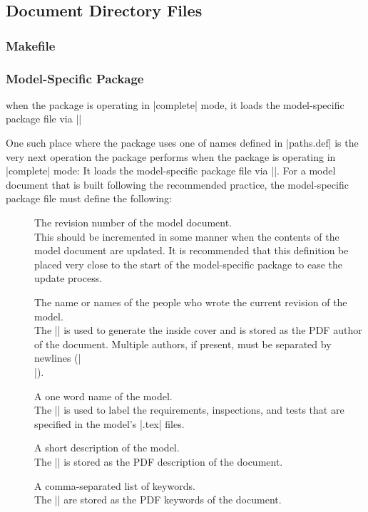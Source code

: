 \subsection{Document Directory Files}
\subsubsection{Makefile}
\subsubsection{Model-Specific Package}\label{sec:model.sty}
when the \dynenv package is operating in |complete| mode,
it loads the model-specific
package file via |\RequirePackage{\MODELNAME}|

One such place where the \dynenv package uses one of names defined in
|paths.def| is the very next operation the \dynenv package performs
when the package is operating in |complete| mode: It loads the model-specific
package file via |\RequirePackage{\MODELNAME}|. For a model document that
is built following the recommended practice, the model-specific
package file must define the following:
\begin{description}
\item[] The revision number of the model document.\\
  This should be incremented in some manner when the contents of the model
  document are updated. It is recommended that this definition be placed very
  close to the start of the model-specific package to ease the update process.
\item[] The name or names of the people who wrote the
  current revision of the model.\\
  The |\ModelAuthor| is used to generate the inside cover and
  is stored as the PDF author of the document.
  Multiple authors, if present, must be separated by newlines (|\\|).
\item[] A one word name of the model.\\
  The |\ModelPrefix| is used to label the requirements, inspections, and tests
  that are specified in the model's |.tex| files.
\item[] A short description of the model.\\
  The |\ModelDesc| is stored as the PDF description of the document.
\item[] A comma-separated list of keywords.\\
  The |\ModelKeywords| are stored as the PDF keywords of the document.
\end{description}

